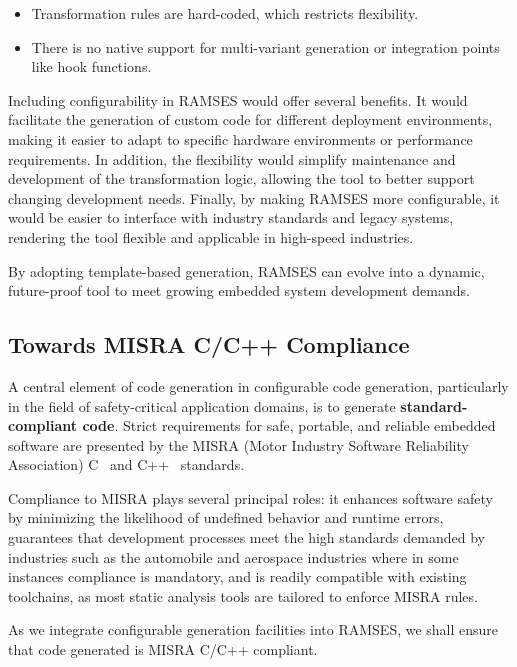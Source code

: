 \begin{itemize} 
	\item Transformation rules are hard-coded, which restricts flexibility.
	\item There is no native support for multi-variant generation or integration points like hook functions. 
\end{itemize}

Including configurability in RAMSES would offer several benefits. It would facilitate the generation of custom code for different deployment environments, making it easier to adapt to specific hardware environments or performance requirements. In addition, the flexibility would simplify maintenance and development of the transformation logic, allowing the tool to better support changing development needs. Finally, by making RAMSES more configurable, it would be easier to interface with industry standards and legacy systems, rendering the tool flexible and applicable in high-speed industries.

\begin{tcolorbox}[colback=green!5, colframe=green!40!black] By adopting template-based generation, RAMSES can evolve into a dynamic, future-proof tool to meet growing embedded system development demands. \end{tcolorbox}

\subsection*{Towards MISRA C/C++ Compliance}

A central element of code generation in configurable code generation, particularly in the field of safety-critical application domains, is to generate \textbf{standard-compliant code}. Strict requirements for safe, portable, and reliable embedded software are presented by the MISRA (Motor Industry Software Reliability Association) C~\cite{Misra_C_2025} and C++~\cite{Misra_Cpp_2023} standards.
\par
Compliance to MISRA plays several principal roles: it enhances software safety by minimizing the likelihood of undefined behavior and runtime errors, guarantees that development processes meet the high standards demanded by industries such as the automobile and aerospace industries where in some instances compliance is mandatory, and is readily compatible with existing toolchains, as most static analysis tools are tailored to enforce MISRA rules.
\par
As we integrate configurable generation facilities into RAMSES, we shall ensure that code generated is MISRA C/C++ compliant.

